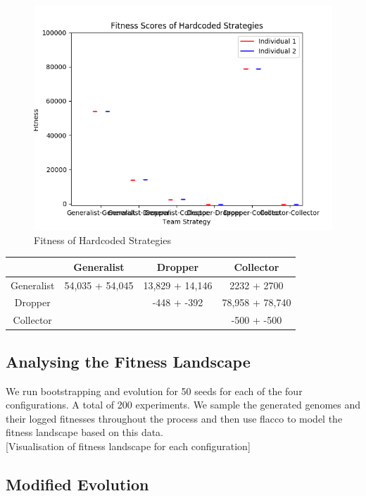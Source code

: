 \documentclass[12pt]{article}  %
\begin{document}
\begin{figure}
	\centering
	\includegraphics[width=\textwidth]{hardcoded_fitness.png}
	\caption{Fitness of Hardcoded Strategies}
	\label{fig:hardcoded}
\end{figure}

\begin{center}
\begin{tabular}{ |c|c|c|c| } 
 \hline
  & Generalist & Dropper & Collector  \\ 
 \hline
 \hline
 Generalist & 54,035 + 54,045  & 13,829 + 14,146 & 2232 + 2700 \\ 
 \hline
 Dropper &  & -448 + -392 & 78,958 + 78,740 \\ 
 \hline
 Collector &  &  & -500 + -500 \\ 
 \hline
 \end{tabular}
\end{center}

\subsection{Analysing the Fitness Landscape}
We run bootstrapping and evolution for 50 seeds for each of the four configurations. A total of 200 experiments. 
We sample the generated genomes and their logged fitnesses throughout the process and then use flacco to model the fitness landscape based on this data.\\

[Visualisation of fitness landscape for each configuration]

\subsection{Modified Evolution}
\end{document}
